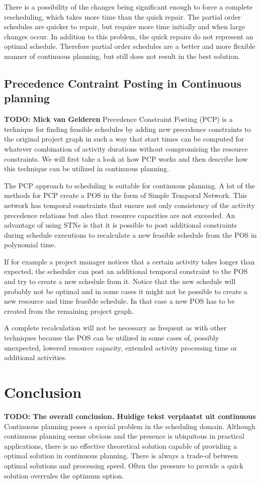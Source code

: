 \documentclass{article}
\newcommand{\TODO}[1]{{\color{red}\textbf{TODO: #1}}}
\begin{document}
There is a possibility of the changes being significant enough to force a complete rescheduling, which takes more time than the quick repair.
The partial order schedules are quicker to repair, but require more time initially and when large changes occur.
In addition to this problem, the quick repairs do not represent an optimal schedule.
Therefore partial order schedules are a better and more flexible manner of continuous planning, but still does not result in the best solution. 


\subsection{Precedence Contraint Posting in Continuous planning}
\TODO{Mick van Gelderen}
Precedence Constraint Posting (PCP) is a technique for finding feasible schedules by adding new precedence constraints to the original project graph in such a way that start times can be computed for whatever combination of activity durations without compromising the resource constraints. We will first take a look at how PCP works and then describe how this technique can be utilized in continuous planning. 

The PCP approach to scheduling is suitable for continuous planning. A lot of the methods for PCP create a POS in the form of Simple Temporal Network. This network has temporal constraints that ensure not only consistency of the activity precedence relations but also that resource capacities are not exceeded. An advantage of using STNs is that it is possible to post additional constraints during schedule executions to recalculate a new feasible schedule from the POS in polynomial time.

If for example a project manager notices that a certain activity takes longer than expected, the scheduler can post an additional temporal constraint to the POS and try to create a new schedule from it. Notice that the new schedule will probably not be optimal and in some cases it might not be possible to create a new resource and time feasible schedule. In that case a new POS has to be created from the remaining project graph. 

A complete recalculation will not be necessary as frequent as with other techniques because the POS can be utilized in some cases of, possibly unexpected, lowered resource capacity, extended activity processing time or additional activities. 

\section{Conclusion}
\TODO{The overall conclusion. Huidige tekst verplaatst uit continuous}
Continuous planning poses a special problem in the scheduling domain.
Although continuous planning seems obvious and the presence is ubiquitous in practical applications, there is no effective theoretical solution capable of providing a optimal solution in continuous planning.
There is always a trade-of between optimal solutions and processing speed.
Often the pressure to provide a quick solution overrules the optimum option.



\end{document}
